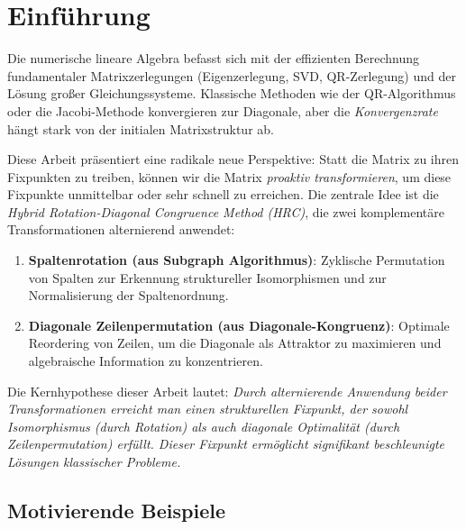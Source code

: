\documentclass[a4paper,12pt]{article}
\theoremstyle{definition}
\begin{document}
\tableofcontents

\newpage

\section{Einführung}

Die numerische lineare Algebra befasst sich mit der effizienten Berechnung fundamentaler Matrixzerlegungen (Eigenzerlegung, SVD, QR-Zerlegung) und der Lösung großer Gleichungssysteme. Klassische Methoden wie der QR-Algorithmus oder die Jacobi-Methode konvergieren zur Diagonale, aber die \emph{Konvergenzrate} hängt stark von der initialen Matrixstruktur ab.

Diese Arbeit präsentiert eine radikale neue Perspektive: Statt die Matrix zu ihren Fixpunkten zu treiben, können wir die Matrix \emph{proaktiv transformieren}, um diese Fixpunkte unmittelbar oder sehr schnell zu erreichen. Die zentrale Idee ist die \emph{Hybrid Rotation-Diagonal Congruence Method (HRC)}, die zwei komplementäre Transformationen alternierend anwendet:

\begin{enumerate}
	\item \textbf{Spaltenrotation (aus Subgraph Algorithmus)}: Zyklische Permutation von Spalten zur Erkennung struktureller Isomorphismen und zur Normalisierung der Spaltenordnung.
	\item \textbf{Diagonale Zeilenpermutation (aus Diagonale-Kongruenz)}: Optimale Reordering von Zeilen, um die Diagonale als Attraktor zu maximieren und algebraische Information zu konzentrieren.
\end{enumerate}

Die Kernhypothese dieser Arbeit lautet: \emph{Durch alternierende Anwendung beider Transformationen erreicht man einen strukturellen Fixpunkt, der sowohl Isomorphismus (durch Rotation) als auch diagonale Optimalität (durch Zeilenpermutation) erfüllt. Dieser Fixpunkt ermöglicht signifikant beschleunigte Lösungen klassischer Probleme.}

\subsection{Motivierende Beispiele}
\end{document}
